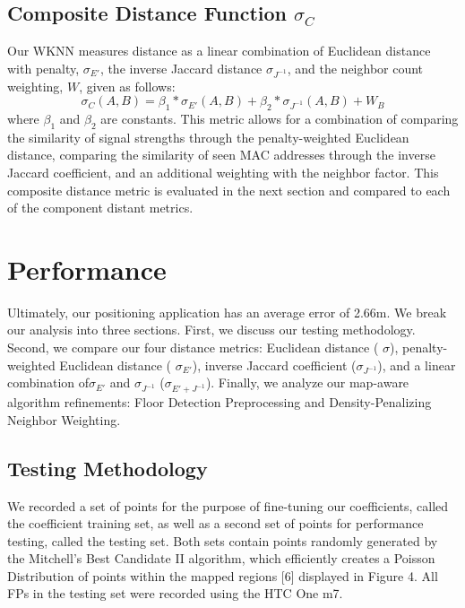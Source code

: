 \documentclass[conference]{IEEEtran}
\begin{document}
\subsection{Composite Distance Function $\sigma_C$}
\indent Our WKNN measures distance as a linear combination of Euclidean distance with penalty, $\sigma_{E'}$,  the inverse Jaccard distance $\sigma_{J^{-1}}$, and the neighbor count weighting, $W$,  given as follows:
\begin{equation}
\label{composite}
\sigma_C(A, B)=\beta_1*\sigma_{E'}(A, B)+\beta_2*\sigma_{J^{-1}}(A, B)+W_B
\end{equation}
\indent where $\beta_1$ and $\beta_2$ are constants. This metric allows for a combination of comparing the similarity of signal strengths through the penalty-weighted Euclidean distance, comparing the similarity of seen MAC addresses through the inverse Jaccard coefficient, and an additional weighting with the neighbor factor. This composite distance metric is evaluated in the next section and compared to each of the component distant metrics.

\section{Performance}

Ultimately, our positioning application has an average error of 2.66m. We break our analysis into three sections. First, we discuss our testing methodology. Second, we compare our four distance metrics: Euclidean distance ( $\sigma$), penalty-weighted Euclidean distance ( $\sigma_{E'}$), inverse Jaccard coefficient ($\sigma_{J^{-1}}$), and a linear combination of$\sigma_{E'}$ and $\sigma_{J^{-1}}$ ($\sigma_{E' + J^{-1}}$). Finally, we analyze our map-aware algorithm refinements: Floor Detection Preprocessing and Density-Penalizing Neighbor Weighting.

\subsection{Testing Methodology}
We recorded a set of points for the purpose of fine-tuning our coefficients, called the coefficient training set, as well as a second set of points for performance testing, called the testing set. Both sets contain points randomly generated by the Mitchell's Best Candidate II algorithm, which efficiently creates a Poisson Distribution of points within the mapped regions [6] displayed in Figure 4. All FPs in the testing set were recorded using the HTC One m7. 
\end{document}
